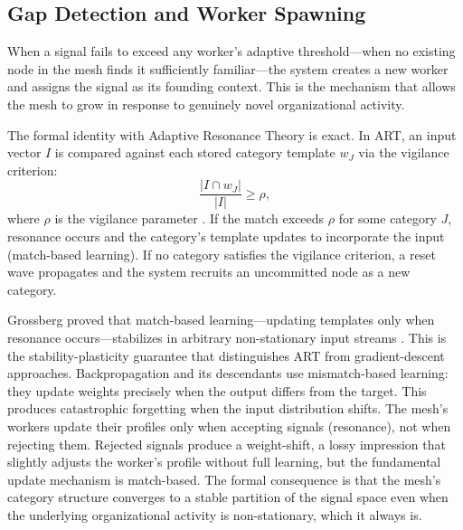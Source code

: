 \documentclass[11pt,a4paper]{article}
\begin{document}
\subsection{Gap Detection and Worker Spawning}
\label{sec:gap}

When a signal fails to exceed any worker's adaptive threshold---when no existing node in the mesh finds it sufficiently familiar---the system creates a new worker and assigns the signal as its founding context. This is the mechanism that allows the mesh to grow in response to genuinely novel organizational activity.

The formal identity with Adaptive Resonance Theory is exact. In ART, an input vector $I$ is compared against each stored category template $w_J$ via the vigilance criterion:
\begin{equation}
\label{eq:art}
\frac{|I \cap w_J|}{|I|} \geq \rho,
\end{equation}
where $\rho$ is the vigilance parameter \citep{carpenter1987}. If the match exceeds $\rho$ for some category $J$, resonance occurs and the category's template updates to incorporate the input (match-based learning). If no category satisfies the vigilance criterion, a reset wave propagates and the system recruits an uncommitted node as a new category.

Grossberg proved that match-based learning---updating templates only when resonance occurs---stabilizes in arbitrary non-stationary input streams \citep{grossberg1976}. This is the stability-plasticity guarantee that distinguishes ART from gradient-descent approaches. Backpropagation and its descendants use mismatch-based learning: they update weights precisely when the output differs from the target. This produces catastrophic forgetting when the input distribution shifts. The mesh's workers update their profiles only when accepting signals (resonance), not when rejecting them. Rejected signals produce a weight-shift, a lossy impression that slightly adjusts the worker's profile without full learning, but the fundamental update mechanism is match-based. The formal consequence is that the mesh's category structure converges to a stable partition of the signal space even when the underlying organizational activity is non-stationary, which it always is.
\end{document}
